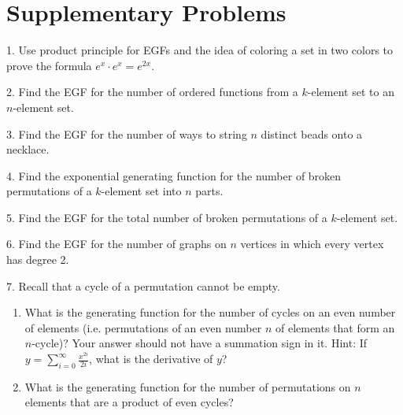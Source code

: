 \documentclass[10pt,]{book}
\theoremstyle{plain}
\theoremstyle{definition}
\theoremstyle{definition}
\numberwithin{equation}{chapter}
\begin{document}
\section[{Supplementary Problems}]{Supplementary Problems}\label{app3-suppprobs}
\begin{exerciselist}
\item[1.]\marginsymbol[-1em]{} \hypertarget{exercise-68}{}Use product principle for EGFs and the idea of coloring a set in two colors to prove the formula \(e^x\cdot e^x = e^{2x}.\)%
\par\smallskip
\item[2.]\marginsymbol[-1em]{} \hypertarget{exercise-69}{}Find the EGF for the number of ordered functions from a \(k\)-element set to an \(n\)-element set.%
\par\smallskip
\item[3.]\marginsymbol[-1em]{} \hypertarget{exercise-70}{}Find the EGF for the number of ways to string \(n\) distinct beads onto a necklace.%
\par\smallskip
\item[4.]\marginsymbol[-1em]{} \hypertarget{exercise-71}{}Find the exponential generating function for the number of broken permutations of a \(k\)-element set into \(n\) parts.%
\par\smallskip
\item[5.]\marginsymbol[-1em]{} \hypertarget{exercise-72}{}Find the EGF for the total number of broken permutations of a \(k\)-element set.%
\par\smallskip
\item[6.]\marginsymbol[-1em]{} \hypertarget{exercise-73}{}Find the EGF for the number of graphs on \(n\) vertices in which every vertex has degree 2.%
\par\smallskip
\item[7.]\marginsymbol[-1em]{} \hypertarget{exercise-74}{}Recall that a cycle of a permutation cannot be empty. \leavevmode%
\begin{enumerate}[label=(\alph*)]
\item\hypertarget{li-137}{}What is the generating function for the number of cycles on an even number of elements (i.e. permutations of an even number \(n\) of elements that form an \(n\)-cycle)?  Your answer should not have a summation sign in it.  Hint: If \(y=
\sum_{i=0}^\infty \frac{x^{2i}}{2i}\), what is the derivative of \(y\)?%
\item\hypertarget{EGF-perm-even-cycles}{}What is the generating function for the number of permutations on \(n\) elements that are a product of even cycles?%

\end{enumerate}
\end{exerciselist}
\end{document}

